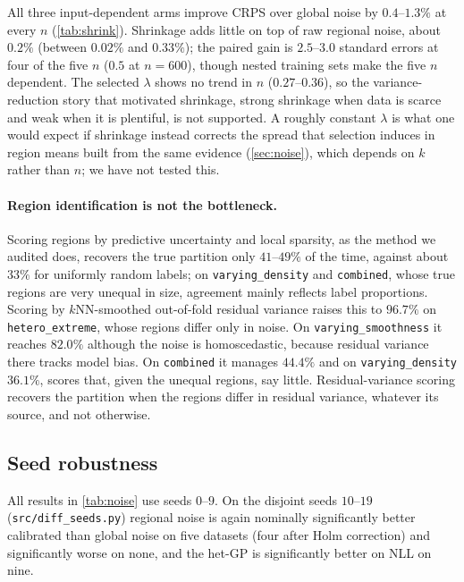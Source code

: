 \documentclass[11pt]{article}
\begin{document}
All three input-dependent arms improve CRPS over global noise by $0.4$--$1.3\%$ at
every $n$ (\cref{tab:shrink}). Shrinkage adds little on top of raw regional noise,
about $0.2\%$ (between $0.02\%$ and $0.33\%$); the paired gain is $2.5$--$3.0$
standard errors at four of the five $n$ ($0.5$ at $n=600$), though nested training
sets make the five $n$ dependent. The selected $\lambda$ shows no trend in $n$
($0.27$--$0.36$), so the variance-reduction story that motivated shrinkage, strong
shrinkage when data is scarce and weak when it is plentiful, is not supported. A
roughly constant $\lambda$ is what one would expect if shrinkage instead corrects the
spread that selection induces in region means built from the same evidence
(\cref{sec:noise}), which depends on $k$ rather than $n$; we have not tested this.

\paragraph{Region identification is not the bottleneck.} Scoring regions by predictive
uncertainty and local sparsity, as the method we audited does, recovers the true
partition only $41$--$49\%$ of the time, against about $33\%$ for uniformly random
labels; on \texttt{varying\_density} and \texttt{combined}, whose true regions are very
unequal in size, agreement mainly reflects label proportions. Scoring by $k$NN-smoothed out-of-fold residual variance raises this
to $96.7\%$ on \texttt{hetero\_extreme}, whose regions differ only in noise. On
\texttt{varying\_smoothness} it reaches $82.0\%$ although the noise is homoscedastic,
because residual variance there tracks model bias. On \texttt{combined} it manages
$44.4\%$ and on \texttt{varying\_density} $36.1\%$, scores that, given the unequal
regions, say little. Residual-variance scoring recovers
the partition when the regions differ in residual variance, whatever its source, and
not otherwise.

\subsection{Seed robustness}
\label{sec:diff}
All results in \cref{tab:noise} use seeds $0$--$9$. On the disjoint seeds $10$--$19$
(\texttt{src/diff\_seeds.py}) regional noise is again nominally significantly better
calibrated than global noise on five datasets (four after Holm correction) and
significantly worse on none, and the het-GP is significantly better on NLL on nine.
\end{document}
